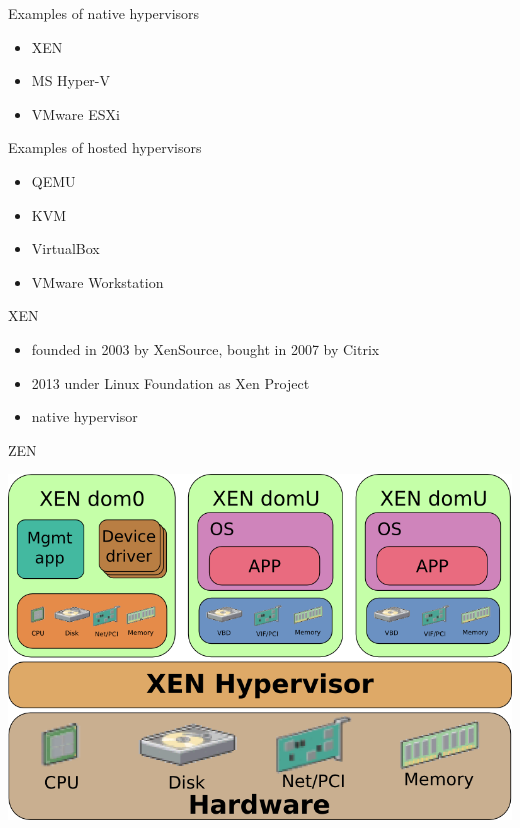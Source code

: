 \documentclass[presentation]{beamer}
\begin{document}
\begin{frame}[label={sec:orgab3aedb}]{Examples of native hypervisors}
\begin{itemize}
\item XEN
\item MS Hyper-V
\item VMware ESXi
\end{itemize}
\end{frame}

\begin{frame}[label={sec:orgd3a5b89}]{Examples of hosted hypervisors}
\begin{itemize}
\item QEMU
\item KVM
\item VirtualBox
\item VMware Workstation
\end{itemize}
\end{frame}

\begin{frame}[label={sec:orge3b530b}]{XEN}
\begin{itemize}
\item founded in 2003 by XenSource, bought in 2007 by Citrix
\item 2013 under Linux Foundation as Xen Project
\item native hypervisor
\end{itemize}
\end{frame}
\begin{frame}[label={sec:orgd3d44c5}]{ZEN}
\begin{center}
\includegraphics[width=.9\linewidth]{./xen.png}
\end{center}
\end{frame}
\end{document}
